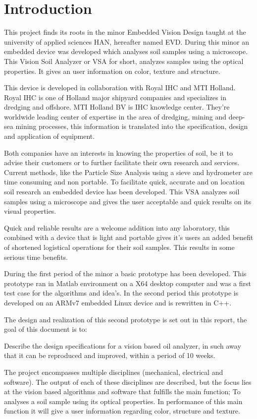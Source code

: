 \documentclass[11pt,fleqn,,a4paper,twoside,openright]{book}
\begin{document}
\tableofcontents %

\cleardoublepage %

\pagestyle{fancy} %

\chapter{Introduction}
This project finds its roots in the minor Embedded Vision Design taught at the university of applied sciences HAN, hereafter named EVD. During this minor an embedded device was developed which analyses soil samples using a microscope. This Vision Soil Analyzer or VSA for short, analyzes samples using the optical properties. It gives an user information on color, texture and structure.

This device is developed in collaboration with Royal IHC and MTI Holland. Royal IHC is one of Holland major shipyard companies and specializes in dredging and offshore. MTI Holland BV is IHC knowledge center. They're worldwide leading center of expertise in the area of dredging, mining and deep-sea mining processes, this information is translated into the specification, design and application of equipment.

Both companies have an interests in knowing the properties of soil, be it to advise their customers or to further facilitate their own research and services. Current methods, like the Particle Size Analysis using a sieve and hydrometer are time consuming and non portable. To facilitate quick, accurate and on location soil research an embedded device has been developed. This VSA analyzes soil samples using a microscope and gives the user acceptable and quick results on its visual properties.

Quick and reliable results are a welcome addition into any laboratory, this combined with a device that is light and portable gives it's users an added benefit of shortened logistical operations for their soil samples. This results in some serious time benefits.

During the first period of the minor a basic prototype has been developed. This prototype ran in Matlab environment on a X64 desktop computer and was a first test case for the algorithms and idea's. In the second period this prototype is developed on an ARMv7 embedded Linux device and is rewritten in C++.

The design and realization of this second prototype is set out in this report, the goal of this document is to:
\begin{sBox}
	Describe the design specifications for a vision based oil analyzer, in such away that it can be reproduced and improved, within a period of 10 weeks.
\end{sBox}
The project encompasses multiple disciplines (mechanical, electrical and software). The output of each of these disciplines are described, but the focus lies at the vision based algorithms and software that fulfills the main function; To analyses a soil sample using its optical properties. In performance of this main function it will give a user information regarding color, structure and texture.
\end{document}

